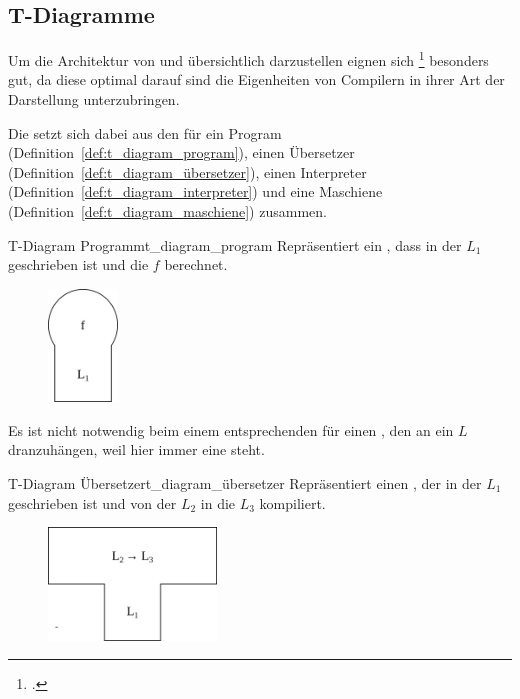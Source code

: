
\subsection{T-Diagramme}
Um die Architektur von  und  übersichtlich darzustellen eignen sich \footcite{earley_formalism_1970} besonders gut, da diese optimal darauf  sind die Eigenheiten von Compilern in ihrer Art der Darstellung unterzubringen.

Die  setzt sich dabei aus den  für ein Program (Definition~\ref{def:t_diagram_program}), einen Übersetzer (Definition~\ref{def:t_diagram_übersetzer}), einen Interpreter (Definition~\ref{def:t_diagram_interpreter}) und eine Maschiene (Definition~\ref{def:t_diagram_maschiene}) zusammen.

\begin{Definition}{T-Diagram Programm}{t_diagram_program}
  Repräsentiert ein , dass in der  $L_1$ geschrieben ist und die  $f$ berechnet.
  \begin{figure}[H]
    \centering
    \includegraphics[height=3cm]{./figures/programm.png}
  \end{figure}
\end{Definition}

\begin{Special_Paragraph}
  Es ist nicht notwendig beim einem entsprechenden  für einen , den  an ein $L$ dranzuhängen, weil hier immer eine  steht.
\end{Special_Paragraph}

\begin{Definition}{T-Diagram Übersetzer}{t_diagram_übersetzer}
  Repräsentiert einen , der in der  $L_1$ geschrieben ist und  von der  $L_2$ in die  $L_3$ kompiliert.
  \begin{figure}[H]
    \centering
    \includegraphics[height=3cm]{./figures/uerbersetzer.png}
  \end{figure}
\end{Definition}

